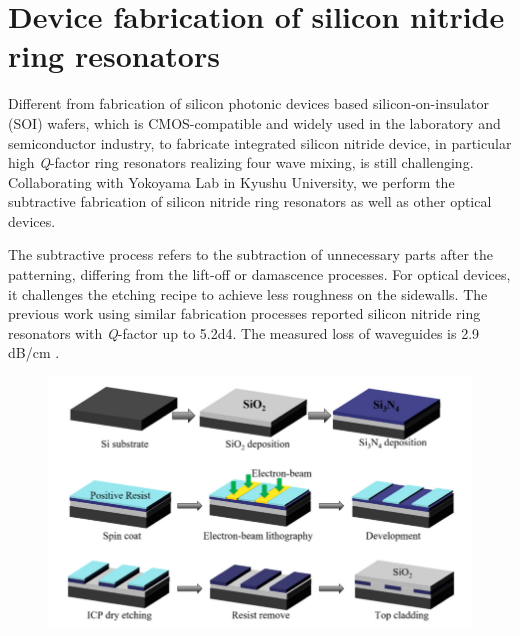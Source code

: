 
\chapter{Device fabrication of silicon nitride ring resonators}\label{chap:4}

Different from fabrication of silicon photonic devices based silicon-on-insulator (SOI) wafers, which is CMOS-compatible and widely used in the laboratory and semiconductor industry, to fabricate integrated silicon nitride device, in particular high \textit{Q}-factor ring resonators realizing four wave mixing, is still challenging.
Collaborating with Yokoyama Lab in Kyushu University, we perform the subtractive fabrication of silicon nitride ring resonators as well as other optical devices. 


The subtractive process refers to the subtraction of unnecessary parts after the patterning, differing from the lift-off or damascence processes. For optical devices, it challenges the etching recipe to achieve less roughness on the sidewalls. 
The previous work using similar fabrication processes reported silicon nitride ring resonators with \textit{Q}-factor up to \num{5.2d4}. The measured loss of waveguides is 2.9 dB/cm \cite{Cheng2017b}. 

\begin{figure}
	\centering
	\includegraphics[width=1.0\linewidth]{imgs/png/fab-flow}
	\label{fig:fab-flow}
\end{figure}

